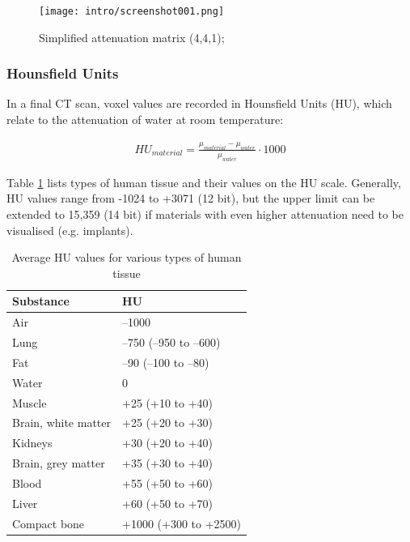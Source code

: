 \begin{figure}[!htb]
	\centering
	\texttt{[image: intro/screenshot001.png]}
	\caption{Simplified attenuation matrix (4,4,1); \cite{Maidment2014}}
	\label{fig:voxel_matrix}
\end{figure}

\subsubsection{Hounsfield Units}

In a final CT scan, voxel values are recorded in Hounsfield Units (HU), which relate to the attenuation of water at room temperature:

\begin{align}
HU_{material} = \frac{\mu_{material} - \mu_{water}}{\mu_{water}} \cdot 1000
\end{align}

Table \ref{tab:HU} lists types of human tissue and their values on the HU scale.
Generally, HU values range from -1024 to +3071 (12 bit), but the upper limit can be extended to 15,359 (14 bit) if materials with even higher attenuation need to be visualised (e.g. implants). \\

\begin{table}[]
	\centering
	\caption{Average HU values for various types of human tissue}
	\label{tab:HU}
	\begin{tabular}{@{}ll@{}}
		\toprule
		Substance           & HU                     \\ \midrule
		Air                 & –1000                  \\
		Lung                & –750 (–950 to –600)    \\
		Fat                 & –90 (–100 to –80)      \\
		Water               & 0                      \\
		Muscle              & +25 (+10 to +40)       \\
		Brain, white matter & +25 (+20 to +30)       \\
		Kidneys             & +30 (+20 to +40)       \\
		Brain, grey matter  & +35 (+30 to +40)       \\
		Blood               & +55 (+50 to +60)       \\
		Liver               & +60 (+50 to +70)       \\
		Compact bone        & +1000 (+300 to +2500)  \\ \bottomrule
	\end{tabular}
\end{table}

